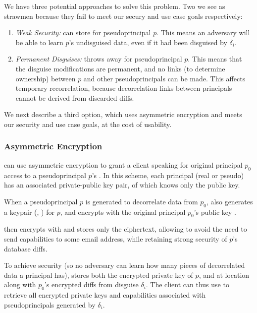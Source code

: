 We have three potential approaches to solve this problem. Two we see as strawmen because they fail
to meet our secury and use case goals respectively:
\begin{enumerate}
    \item \emph{Weak Security:} \sys can store  for pseudoprincipal $p$. This means
        an adversary will be able to learn $p$'s undisguised data, even if it had been disguised by
        $\delta_i$.

    \item \emph{Permanent Disguises:} \sys throws away  for pseudoprincipal $p$. This means that the
        disguise modifications are permanent, and no links (to determine ownership) between
        $p$ and other pseudoprincipals can be made. This affects temporary recorrelation, because
        decorrelation links between principals cannot be derived from discarded diffs.
\end{enumerate}

We next describe a third option, which uses asymmetric encryption and meets our security and use
case goals, at the cost of usability.

\subsubsection{Asymmetric Encryption} 

\sys can use asymmetric encryption to grant a client speaking for original principal $p_0$ access to
a pseudoprincipal $p$'s . In this scheme, each principal (real or pseudo) has an
associated private-public key pair, of which \sys knows only the public key. 

When a pseudoprincipal $p$ is generated to decorrelate data from $p_0$, \sys also generates a
keypair (, ) for $p$, and encrypts  with the original principal $p_0$'s
public key . 

\sys then encrypts  with  and stores only the ciphertext, allowing \sys to avoid
the need to send capabilities to some email address, while retaining strong security of $p$'s
database diffs. 

To achieve security (so no adversary can learn how many pieces of decorrelated data a principal
has), \sys stores both the encrypted private key of $p$, and  at location
 along with $p_0$'s encrypted diffs from disguise $\delta_i$. The client can thus
use  to retrieve all encrypted private keys and capabilities associated with
pseudoprincipals generated by $\delta_i$.

